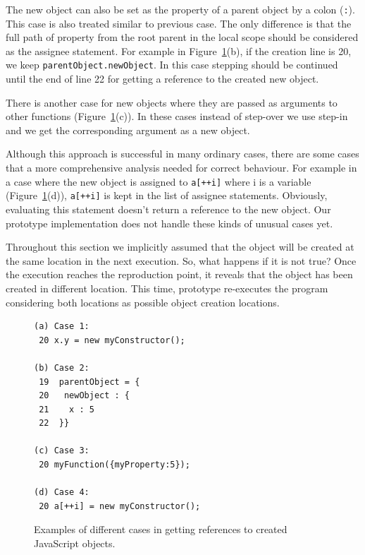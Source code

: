 \documentclass{sig-alternate}
\begin{document}
The new object can also be set as the property of a parent object by a
colon (\texttt{:}). This case is also treated similar to previous case. The
only difference is that the full path of property from the root parent
in the local scope should be considered as the assignee statement. For
example in Figure~\ref{fig:objectCreation}(b), if the creation line
is 20, we keep \texttt{parentObject.newObject}. In this case stepping
should be continued until the end of line 22 for getting a reference
to the created new object.

There is another case for new objects where they are passed as
arguments to other functions (Figure~\ref{fig:objectCreation}(c)). In these
cases instead of step-over we use step-in and we get the corresponding
argument as a new object.

Although this approach is successful in many ordinary cases, there are some 
cases that a more comprehensive analysis needed for correct behaviour. For example in a case
where the new object is assigned to \texttt{a[++i]} where i is a variable
(Figure~\ref{fig:objectCreation}(d)), \texttt{a[++i]} is kept in the list
of assignee statements. Obviously, evaluating this statement doesn't return
a reference to the new object. Our prototype implementation does not handle these kinds of unusual cases yet.

Throughout this section we implicitly assumed that the object will be created at 
the same location in the next execution. So, what happens if it
is not true? Once the execution reaches the reproduction point, it
reveals that the object has been created in different location. This time,
prototype re-executes the program considering both locations as possible 
object creation locations.


\begin{figure}[htp]
\lstset{basicstyle=\scriptsize}
\begin{lstlisting}[language=myLang, framerule=0pt]
(a) Case 1:
 20 x.y = new myConstructor();

(b) Case 2:
 19  parentObject = {
 20   newObject : {
 21    x : 5
 22  }}

(c) Case 3:
 20 myFunction({myProperty:5});

(d) Case 4:
 20 a[++i] = new myConstructor();
\end{lstlisting} 
\caption{Examples of different cases in getting references to created JavaScript objects.}
\label{fig:objectCreation}
\end{figure}
\end{document}
